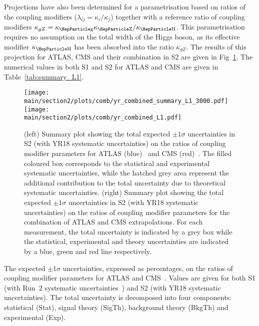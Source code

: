 Projections have also been determined for a parametrisation based on ratios of the coupling modifiers ($\lambda_{ij} = \kappa_{i}/\kappa_{j}$) together with a reference ratio of coupling modifiers $\kappa_{gZ} = \kglu\kZ/\kH$.
This parametrisation requires no assumption on the total width of the Higgs boson, as its effective modifier $\kH$ has been absorbed into the ratio $\kappa_{gZ}$. The results of this projection for ATLAS, CMS and their combination in S2 are given in Fig~\ref{fig:summary_L1}.
The numerical values in both S1 and S2 for ATLAS and CMS are given in Table~\ref{tab:summary_L1}.
\begin{figure}[hbtp]
\centering
\texttt{[image: \\main/section2/plots/comb/yr\_combined\_summary\_L1\_3000.pdf]}%
\texttt{[image: \\main/section2/plots/comb/yr\_combined\_L1.pdf]}%
\caption{(left) Summary plot showing the total expected $\pm 1\sigma$ uncertainties in S2 (with YR18 systematic uncertainties) on the ratios of coupling modifier parameters  for ATLAS (blue)~\cite{ATL-PHYS-PUB-2018-054} and CMS (red)~\cite{CMS-PAS-FTR-18-011}. The filled coloured box corresponds to the statistical and experimental systematic uncertainties, while the hatched grey area represent the additional contribution to the total uncertainty due to theoretical systematic uncertainties.
(right) Summary plot showing the total expected $\pm 1\sigma$  uncertainties in S2 (with YR18 systematic uncertainties) on the ratios of coupling modifier parameters  for the combination of ATLAS and CMS extrapolations. For each measurement,  the total uncertainty is indicated by a grey box while the statistical, experimental and theory uncertainties are indicated by a blue, green and red line respectively.}
\label{fig:summary_L1}
\end{figure}


\begin{table}[hbtp]
\centering
\caption{The expected $\pm 1\sigma$ uncertainties, expressed as percentages, on the ratios of coupling modifier parameters for ATLAS and CMS~\cite{ATL-PHYS-PUB-2018-054,CMS-PAS-FTR-18-011}.  Values are given for both S1 (with Run~2 systematic uncertainties~\cite{Sirunyan:2018koj}) and S2 (with YR18 systematic uncertainties). The total uncertainty is decomposed into four components: statistical (Stat), signal theory (SigTh), background theory (BkgTh) and experimental (Exp).}
\small
\hspace{0.5cm}

\label{tab:summary_L1}
\vspace{0.5cm}
\end{table}


